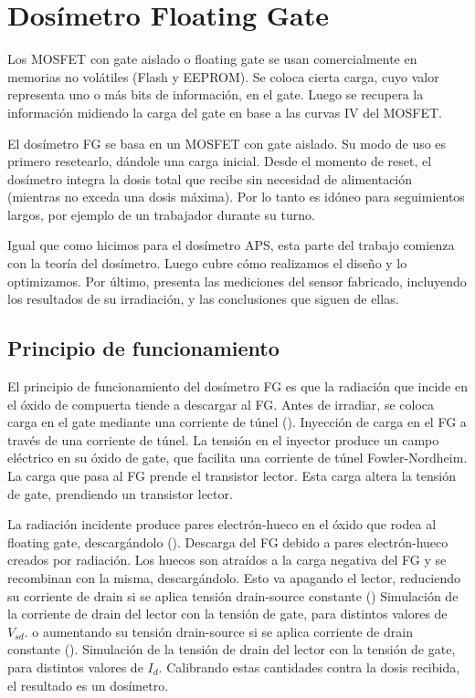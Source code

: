 \section{Dosímetro Floating Gate}
Los MOSFET con gate aislado o floating gate se usan comercialmente
en memorias no volátiles (Flash y EEPROM).
Se coloca cierta carga, 
cuyo valor representa uno o más bits de información, en el gate.
Luego se recupera la información midiendo la carga del gate
en base a las curvas IV del MOSFET.

El dosímetro FG se basa en un MOSFET con gate aislado.
Su modo de uso es primero resetearlo, dándole una carga inicial.
Desde el momento de reset, el dosímetro integra 
la dosis total que recibe sin necesidad de alimentación
(mientras no exceda una dosis máxima).
Por lo tanto es idóneo para seguimientos largos,
por ejemplo de un trabajador durante su turno.

Igual que como hicimos para el dosímetro APS,
esta parte del trabajo comienza con la teoría del dosímetro.
Luego cubre cómo realizamos el diseño y lo optimizamos.
Por último, presenta las mediciones del sensor fabricado,
incluyendo los resultados de su irradiación,
y las conclusiones que siguen de ellas.
%
\subsection{Principio de funcionamiento}
El principio de funcionamiento del dosímetro FG 
es que la radiación que incide
en el óxido de compuerta tiende a descargar al FG.
Antes de irradiar,
se coloca carga en el gate mediante una corriente de túnel 
().
{ Inyección de carga en el FG a través de una corriente de túnel.
La tensión en el inyector produce un campo eléctrico en su óxido de gate,
que facilita una corriente de túnel Fowler-Nordheim.
La carga que pasa al FG prende el transistor lector.}
Esta carga altera la tensión de gate, prendiendo un transistor lector.

La radiación incidente produce pares electrón-hueco en el óxido
que rodea al floating gate, descargándolo
().
{ Descarga del FG debido a pares electrón-hueco creados por
radiación.
Los huecos son atraídos a la carga negativa del FG y
se recombinan con la misma, descargándolo.}
Esto va apagando el lector,
reduciendo su corriente de drain si se aplica tensión drain-source constante
()
{Simulación de la corriente de drain del lector con la tensión de gate,
para distintos valores de $V_{sd}$.}
o aumentando su tensión drain-source si se aplica corriente de drain constante
().
{Simulación de la tensión de drain del lector con la tensión de gate,
para distintos valores de $I_d$.}
Calibrando estas cantidades contra la dosis recibida, 
el resultado es un dosímetro.
%
